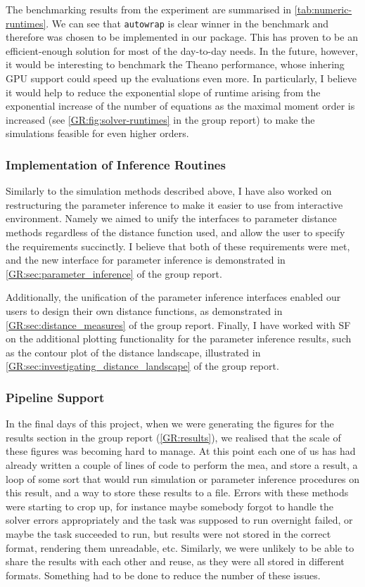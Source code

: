 The benchmarking results from the experiment are summarised in \autoref{tab:numeric-runtimes}. 
We can see that \verb"autowrap" is clear winner in the benchmark and therefore was chosen to be implemented in our package.
This has proven to be an efficient-enough solution for most of the day-to-day needs. 
In the future, however, it would be interesting to benchmark the Theano performance, whose inhering GPU support could speed up the evaluations even more.
In particularly, I believe it would help to reduce the exponential slope of runtime arising from the exponential increase of the number of equations as the maximal moment order is increased (see \autoref{GR:fig:solver-runtimes} in the group report) to make the simulations feasible for even higher orders. 

\subsubsection{Implementation of Inference Routines}

Similarly to the simulation methods described above, I have also worked on restructuring the parameter inference to make it easier to use from interactive environment. 
Namely we aimed to unify the interfaces to parameter distance methods regardless of the distance function used, and allow the user to specify the requirements succinctly.
I believe that both of these requirements were met, and the new interface for parameter inference is demonstrated in \autoref*{GR:sec:parameter_inference} of the group report.

Additionally, the unification of the parameter inference interfaces enabled our users to design their own distance functions, as demonstrated in \autoref*{GR:sec:distance_measures} of the group report.
Finally, I have worked with SF on the additional plotting functionality for the parameter inference results, such as the contour plot of the distance landscape, illustrated in 
\autoref*{GR:sec:investigating_distance_landscape} of the group report.

\subsubsection{Pipeline Support}

In the final days of this project, when we were generating the figures for the results section in the group report (\autoref{GR:results}), we realised that the scale of these figures was becoming hard to manage. 
At this point each one of us has had already written a couple of lines of code to perform the \acrlong{mea}, and store a result, a loop of some sort that would run simulation or parameter inference procedures on this result, and a way to store these results to a file. 
Errors with these methods were starting to crop up, for instance maybe somebody forgot to handle the solver errors appropriately and the task was supposed to run overnight failed, or maybe the task succeeded to run, but results were not stored in the correct format, rendering them unreadable, etc.
Similarly, we were unlikely to be able to share the results with each other and reuse, as they were all stored in different formats.
Something had to be done to reduce the number of these issues.


